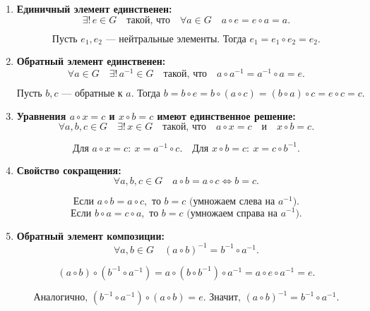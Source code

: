 \begin{shex}
    \begin{enumerate}
        \item \textbf{Единичный элемент единственен:} 
              \[
              \exists!\, e \in G \quad \text{такой, что} \quad \forall a \in G \quad a \circ e = e \circ a = a.
              \]
              
              \[
              \text{Пусть } e_1, e_2 \text{ — нейтральные элементы. Тогда } e_1 = e_1 \circ e_2 = e_2.
              \]

        \item \textbf{Обратный элемент единственен:} 
              \[
              \forall a \in G \quad \exists!\, a^{-1} \in G \quad \text{такой, что} \quad a \circ a^{-1} = a^{-1} \circ a = e.
              \]
              
              \[
              \text{Пусть } b, c \text{ — обратные к } a. \text{ Тогда } b = b \circ e = b \circ (a \circ c) = (b \circ a) \circ c = e \circ c = c.
              \]

        \item \textbf{Уравнения \( a \circ x = c \) и \( x \circ b = c \) имеют единственное решение:} 
              \[
              \forall a, b, c \in G \quad \exists!\, x \in G \quad \text{такой, что} \quad a \circ x = c \quad \text{и} \quad x \circ b = c.
              \]
              
              \[
              \text{Для } a \circ x = c: \ x = a^{-1} \circ c. \quad \text{Для } x \circ b = c: \ x = c \circ b^{-1}.
              \]

        \item \textbf{Свойство сокращения:} 
              \[
              \forall a, b, c \in G \quad a \circ b = a \circ c \iff b = c.
              \]
              
              \[
              \text{Если } a \circ b = a \circ c, \text{ то } b = c \text{ (умножаем слева на } a^{-1}). 
              \]
              \[
              \text{Если } b \circ a = c \circ a, \text{ то } b = c \text{ (умножаем справа на } a^{-1}).
              \]

        \item \textbf{Обратный элемент композиции:} 
              \[
              \forall a, b \in G \quad (a \circ b)^{-1} = b^{-1} \circ a^{-1}.
              \]
              
              \[
              (a \circ b) \circ (b^{-1} \circ a^{-1}) = a \circ (b \circ b^{-1}) \circ a^{-1} = a \circ e \circ a^{-1} = e.
              \]
              
              \[
              \text{Аналогично, } (b^{-1} \circ a^{-1}) \circ (a \circ b) = e. \text{ Значит, } (a \circ b)^{-1} = b^{-1} \circ a^{-1}.
              \]
              
    \end{enumerate}
\end{shex}

